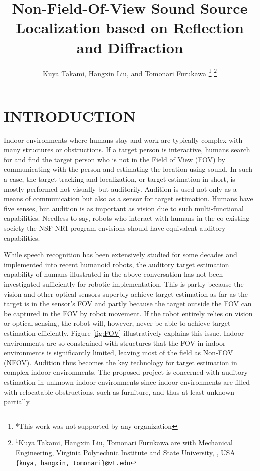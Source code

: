 \documentclass[letterpaper, 10 pt, conference]{ieeeconf}  %
\title{\LARGE \bf
Non-Field-Of-View Sound Source Localization based on Reflection and Diffraction
}
\author{Kuya Takami, Hangxin Liu, and Tomonari Furukawa%
\thanks{*This work was not supported by any organization}%
\thanks{$^{1}$Kuya Takami, Hangxin Liu, Tomonari Furukawa are with Mechanical Engineering, Virginia Polytechnic Institute and State University, , USA
        {\tt\small \{kuya, hangxin, tomonari\}@vt.edu}}%
}
\begin{document}
\maketitle
\thispagestyle{empty}
\pagestyle{empty}


\begin{abstract}

\end{abstract}


\section{INTRODUCTION}
Indoor environments where humans stay and work are typically complex with many structures or obstructions. If a target person is interactive, humans search for and find the target person who is not in the Field of View (FOV) by communicating with the person and estimating the location using sound.  In such a case, the target tracking and localization, or target estimation in short, is mostly performed not visually but auditorily. Audition is used not only as a means of communication but also as a sensor for target estimation. Humans have five senses, but audition is as important as vision due to such multi-functional capabilities.  Needless to say, robots who interact with humans in the co-existing society the NSF NRI program envisions should have equivalent auditory capabilities.  

While speech recognition has been extensively studied for some decades and implemented into recent humanoid robots, the auditory target estimation capability of humans illustrated in the above conversation has not been investigated sufficiently for robotic implementation.  This is partly because the vision and other optical sensors superbly achieve target estimation as far as the target is in the sensor's FOV and partly because the target outside the FOV can be captured in the FOV by robot movement.  If the robot entirely relies on vision or optical sensing, the robot will, however, never be able to achieve target estimation efficiently.  Figure \ref{fig:FOV} illustratively explains this issue.  Indoor environments are so constrained with structures that the FOV in indoor environments is significantly limited, leaving most of the field as Non-FOV (NFOV).  Audition thus becomes the key technology for target estimation in complex indoor environments.  The proposed project is concerned with auditory estimation in unknown indoor environments since indoor environments are filled with relocatable obstructions, such as furniture, and thus at least unknown partially.  
\end{document}

